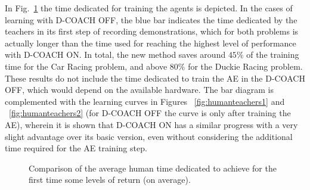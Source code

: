 In Fig.~\ref{fig:stacked_bar} the time dedicated for training the agents is depicted. In the cases of learning with D-COACH OFF, the blue bar indicates the time dedicated by the teachers in its first step of recording demonstrations, which for both problems is actually longer than the time used for reaching the highest level of performance with D-COACH ON. In total, the new method saves around $45\%$ of the training time for the Car Racing problem, and above $80\%$ for the Duckie Racing problem. These results do not include the time dedicated to train the AE in the D-COACH OFF, which would depend on the available hardware. The bar diagram is complemented with the learning curves in Figures ~\ref{fig:humanteachers1} and ~\ref{fig:humanteachers2} (for D-COACH OFF the curve is only after training the AE), wherein it is shown that D-COACH ON has a similar progress with a very slight advantage over its basic version, even without considering the additional time required for the AE training step.

\begin{figure}[H]
\centering
{}
\caption[Comparison of the average human time dedicated to achieve for the first time some levels of return.]{Comparison of the average human time dedicated to achieve for the first time some levels of return (on average).} 
\label{fig:stacked_bar} 
\end{figure}

